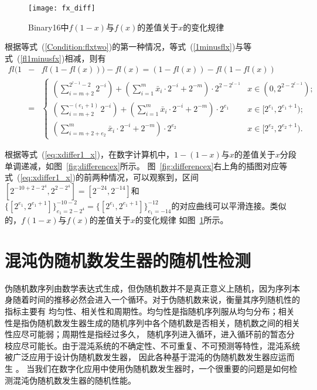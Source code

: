 \begin{figure}[!htb]
\centering
\begin{minipage}{1.25\BigOneImW}
\centering
\texttt{[image: fx\_diff]}
\end{minipage}
\caption{Binary16中$f(1-x)$与$f(x)$的差值关于$x$的变化规律}
\label{fig:differencefx}
\end{figure}

根据等式~(\ref{Condition:flxtwo})的第一种情况，等式~(\ref{1minusflx})与等式~(\ref{fl1minusfx})相减，则有
\begin{eqnarray}
\mathit{fl}(1&-&\mathit{fl}(1-\mathit{fl}(x)))-\mathit{fl}(x)
= (1-\mathit{fl}(x))-\mathit{fl}(1-\mathit{fl}(x)) \nonumber\\
&=&\begin{cases}
(\sum_{i=m+2}^{2^{l-1}-2} 2^{-i})
                          +(\sum_{i=1}^{m} \bar{x}_i\cdot 2^{-i}+ 2^{-m})\cdot 2^{2-2^{l-1}}   & x\in (0,2^{2-2^{l-1}}); \\
(\sum_{i=m+2}^{-(e_1+1)} 2^{-i})+(\sum_{i=1}^{m} \bar{x}_i\cdot 2^{-i}+ 2^{-m} )\cdot 2^{e_1}  & x\in [2^{e_1},2^{e_1+1}); \\
(\sum_{i=m+2+e_2}^{m} \bar{x}_i\cdot 2^{-i}+ 2^{-m} )\cdot 2^{e_2}                             & x\in [2^{e_2},2^{e_2+1}).
\end{cases}
\label{eq:xdiffer1_x}
\end{eqnarray}

根据等式~(\ref{eq:xdiffer1_x})，在数字计算机中，$1-(1-x)$与$x$的差值关于$x$分段单调递减，如图~\ref{fig:differencex}所示。
图~\ref{fig:differencex}右上角的插图对应等式~(\ref{eq:xdiffer1_x})的前两种情况，可以观察到，区间
$[2^{-10+2-2^4}, 2^{2-2^4}]=[2^{-24}, 2^{-14}]$和$\{[2^{e_1}, 2^{e_1+1}]\}_{e_1=2-2^4}^{-10-2}
=\{[2^{e_1}, 2^{e_1+1}]\}_{e_1=-14}^{-12}$的对应曲线可以平滑连接。类似的，$f(1-x)$与$f(x)$的差值关于$x$的变化规律
如图~\ref{fig:differencefx}所示。

\section{混沌伪随机数发生器的随机性检测}

伪随机数序列由数学表达式生成，但伪随机数并不是真正意义上随机，因为序列本身随着时间的推移必然会进入一个循环。对于伪随机数来说，衡量其序列随机性的指标主要有
均匀性、相关性和周期性。均匀性是指随机序列服从均匀分布；相关性是指伪随机数发生器生成的随机序列中各个随机数是否相关，随机数之间的相关性应尽可能弱；周期性是指经过多久，
随机序列进入循环，进入循环前的暂态分枝应尽可能长。由于混沌系统的不确定性、不可重复、不可预测等特性，混沌系统被广泛应用于设计伪随机数发生器，
因此各种基于混沌的伪随机数发生器应运而生
。
当我们在数字化应用中使用伪随机数发生器时，一个很重要的问题是如何检测混沌伪随机数发生器的随机性能。

